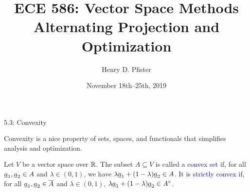 \documentclass[10pt,letterpaper,english]{beamer}
\newif\ifslow
\begin{document}
\ifslow

\title{ECE 586: Vector Space Methods \\ Alternating Projection and Optimization}
\author{Henry D. Pfister \\ \univ}
\date{November 18th--25th, 2019}
\maketitle


\begin{frame}{5.3: Convexity}

\vspace{-1mm}

\begin{minipage}{0.75\textwidth}
Convexity is a nice property of sets, spaces, and functionals that simplifies analysis and optimization.

\begin{definition}
Let $V$ be a vector space over $\mathbb{R}$.
The subset $A \subseteq V$ is called a \textcolor{blue}{convex set} if, for all $\underline{a}_1,\underline{a}_2 \in A$ and $\lambda\in(0,1)$, we have $\lambda \underline{a}_1 + (1-\lambda) \underline{a}_2 \in A$.
It is \textcolor{blue}{strictly convex} if, for all $\underline{a}_1,\underline{a}_2 \in \overline{A}$ and $\lambda\in(0,1)$,
$\lambda \underline{a}_1 + (1-\lambda) \underline{a}_2 \in {A}^{\circ}$.
\end{definition}
\end{minipage}
\hfill
\begin{minipage}{0.22\textwidth}
\end{minipage}


\end{frame}
\end{document}
